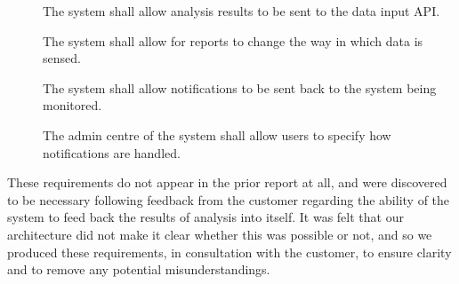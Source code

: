 \begin{description}
 \item[] The system shall allow analysis results to be sent
 to the data input API.

 \item[] The system shall allow for reports to change the way
 in which data is sensed.

 \item[] The system shall allow notifications to be sent back
 to the system being monitored.

 \item[] The admin centre of the system shall allow users to
 specify how notifications are handled. 
\end{description}

These requirements do not appear in the prior report at all, and were
discovered to be necessary following feedback from the customer
regarding the ability of the system to feed back the results of
analysis into itself. It was felt that our architecture did not make
it clear whether this was possible or not, and so we produced these
requirements, in consultation with the customer, to ensure clarity and
to remove any potential misunderstandings.
